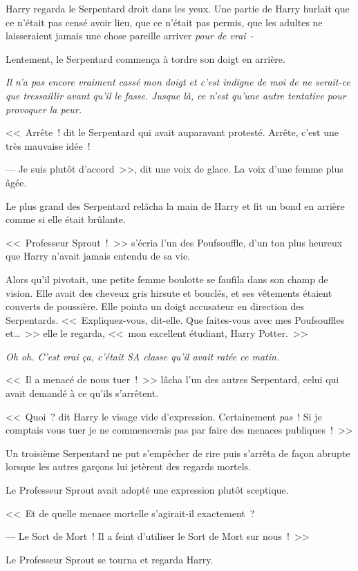 Harry regarda le Serpentard droit dans les yeux. Une partie de Harry hurlait que ce n'était pas censé avoir lieu, que ce n'était pas permis, que les adultes ne laisseraient jamais une chose pareille arriver \emph{pour de vrai}~-

Lentement, le Serpentard commença à tordre son doigt en arrière.

\emph{Il n'a pas encore vraiment cassé mon doigt et c'est indigne de moi de ne serait-ce que tressaillir avant qu'il le fasse. Jusque là, ce n'est qu'une autre tentative pour provoquer la peur.}

<<~Arrête~! dit le Serpentard qui avait auparavant protesté. Arrête, c'est une très mauvaise idée~!

--- Je suis plutôt d'accord~>>, dit une voix de glace. La voix d'une femme plus âgée.

Le plus grand des Serpentard relâcha la main de Harry et fit un bond en arrière comme si elle était brûlante.

<<~Professeur Sprout~!~>> s'écria l'un des Poufsouffle, d'un ton plus heureux que Harry n'avait jamais entendu de sa vie.

Alors qu'il pivotait, une petite femme boulotte se faufila dans son champ de vision. Elle avait des cheveux gris hirsute et bouclés, et ses vêtements étaient couverts de poussière. Elle pointa un doigt accusateur en direction des Serpentards. <<~Expliquez-vous, dit-elle. Que faites-vous avec mes Poufsouffles et…~>> elle le regarda, <<~mon excellent étudiant, Harry Potter.~>>

\emph{Oh oh. C'est vrai ça, c'était SA classe qu'il avait ratée ce matin.}

<<~Il a menacé de nous tuer~!~>> lâcha l'un des autres Serpentard, celui qui avait demandé à ce qu'ils s'arrêtent.

<<~Quoi~? dit Harry le visage vide d'expression. Certainement \emph{pas}~! Si je comptais vous tuer je ne commencerais pas par faire des menaces publiques~!~>>

Un troisième Serpentard ne put s'empêcher de rire puis s'arrêta de façon abrupte lorsque les autres garçons lui jetèrent des regards mortels.

Le Professeur Sprout avait adopté une expression plutôt sceptique.

<<~Et de quelle menace mortelle s'agirait-il exactement~?

--- Le Sort de Mort~! Il a feint d'utiliser le Sort de Mort sur nous~!~>>

Le Professeur Sprout se tourna et regarda Harry.


